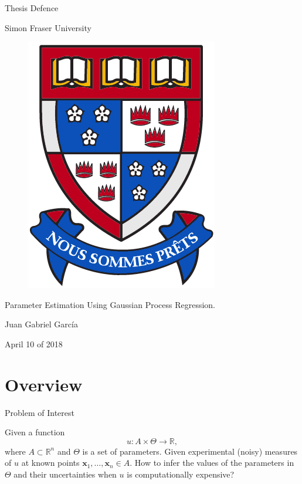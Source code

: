 \documentclass[11pt]{beamer}
\theoremstyle{plain}
\theoremstyle{definition}
\newcommand\ChangeFont{\fontsize{9}{7.2}\selectfont}
\begin{document}

\begin{frame}{Thesis Defence}
\begin{center}
\large{Simon Fraser University}
\end{center}
\begin{figure}
\includegraphics[scale=0.15]{log}
\end{figure}
\begin{center}
Parameter Estimation Using Gaussian Process Regression.
\end{center}

\begin{center}
Juan Gabriel Garc{\'i}a
\end{center}

\begin{center}
April 10 of 2018
\end{center}
\end{frame}

\AtBeginSection[] 
{ 
\begin{frame} 
\ChangeFont 
\frametitle{Content} 
\tableofcontents[currentsection] 
\end{frame} 
} 











\section{Overview}
\begin{frame}{Problem of Interest}

Given a function
\begin{equation*}
u:A\times\Theta\rightarrow \mathbb{R},
\end{equation*}
where $A\subset\mathbb{R}^{n}$ and $\Theta$ is a set of parameters. Given
experimental (noisy) measures of $u$ at known points $\textbf{x}_{1},\ldots,\textbf{x}_{n}\in A$.
How to infer the values of the parameters in $\Theta$ and their uncertainties when 
$u$ is computationally expensive?

\end{frame}
\end{document}
